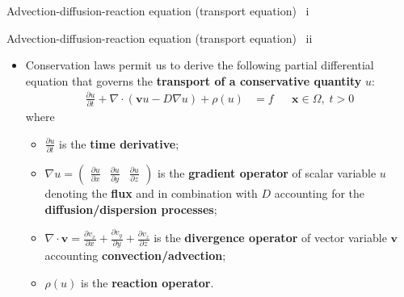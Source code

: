 \begin{frame}{Advection-diffusion-reaction equation (transport equation) \, i}
\begin{itemize}
\end{itemize}
%
\end{frame}
\begin{frame}{Advection-diffusion-reaction equation (transport equation) \, ii}
	\begin{itemize}
		\item Conservation laws permit us to derive the following partial differential
		equation that governs the {\bf transport of a conservative quantity} $u$:
		{
			\small
			\begin{align*}
				\frac{\partial u}{\partial t}+\nabla\cdot(\boldsymbol{v}u-D\nabla u) + \rho (u) & =f &  & \boldsymbol{x}\in\Omega,\;t>0
			\end{align*}
		}
		where \\[5pt]
		\begin{itemize}
			\item $\frac{\partial u}{\partial t}$ is the  \alert{\bf time derivative};\\[2pt]
			\item $\nabla u = \begin{pmatrix}\tfrac{\partial u}{\partial x} & \tfrac{\partial u}{\partial y} & \tfrac{\partial u}{\partial z}\end{pmatrix} $ is the \alert{\bf gradient operator} of scalar variable $u$ denoting the  \alert{\bf flux} and in combination with $D$ accounting for the \alert{\bf diffusion/dispersion processes}; \\[2pt]
			\item $\nabla\cdot\boldsymbol{v} =\tfrac{\partial v_{x}}{\partial x}+\tfrac{\partial v_{y}}{\partial y}+\tfrac{\partial v_{z}}{\partial z}$ is the \alert{\bf divergence operator} of vector
			variable $\boldsymbol{v}$ accounting \alert{\bf convection/advection};\\[2pt]
			\item $\rho (u)$ is the \alert{\bf reaction operator}. 
		\end{itemize}
	\end{itemize}
\end{frame}
